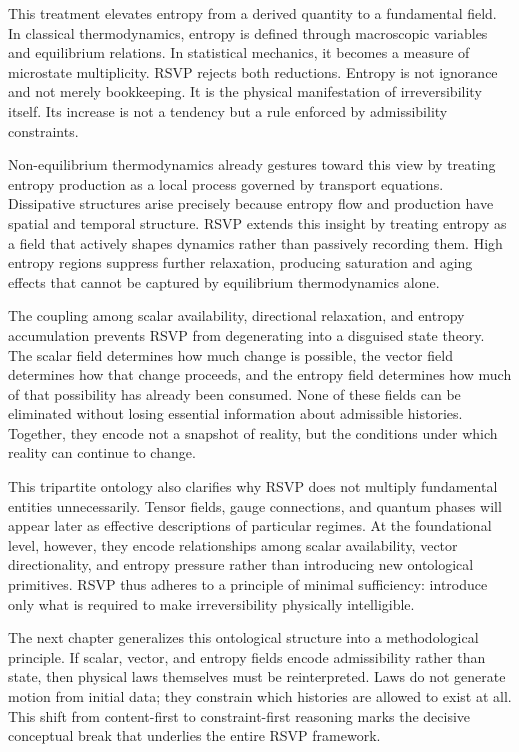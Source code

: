 \documentclass[11pt,oneside]{book}
\begin{document}
This treatment elevates entropy from a derived quantity to a fundamental field. In classical thermodynamics, entropy is defined through macroscopic variables and equilibrium relations. In statistical mechanics, it becomes a measure of microstate multiplicity. RSVP rejects both reductions. Entropy is not ignorance and not merely bookkeeping. It is the physical manifestation of irreversibility itself. Its increase is not a tendency but a rule enforced by admissibility constraints.

Non-equilibrium thermodynamics already gestures toward this view by treating entropy production as a local process governed by transport equations. Dissipative structures arise precisely because entropy flow and production have spatial and temporal structure. RSVP extends this insight by treating entropy as a field that actively shapes dynamics rather than passively recording them. High entropy regions suppress further relaxation, producing saturation and aging effects that cannot be captured by equilibrium thermodynamics alone.

The coupling among scalar availability, directional relaxation, and entropy accumulation prevents RSVP from degenerating into a disguised state theory. The scalar field determines how much change is possible, the vector field determines how that change proceeds, and the entropy field determines how much of that possibility has already been consumed. None of these fields can be eliminated without losing essential information about admissible histories. Together, they encode not a snapshot of reality, but the conditions under which reality can continue to change.

This tripartite ontology also clarifies why RSVP does not multiply fundamental entities unnecessarily. Tensor fields, gauge connections, and quantum phases will appear later as effective descriptions of particular regimes. At the foundational level, however, they encode relationships among scalar availability, vector directionality, and entropy pressure rather than introducing new ontological primitives. RSVP thus adheres to a principle of minimal sufficiency: introduce only what is required to make irreversibility physically intelligible.

The next chapter generalizes this ontological structure into a methodological principle. If scalar, vector, and entropy fields encode admissibility rather than state, then physical laws themselves must be reinterpreted. Laws do not generate motion from initial data; they constrain which histories are allowed to exist at all. This shift from content-first to constraint-first reasoning marks the decisive conceptual break that underlies the entire RSVP framework.
\end{document}
